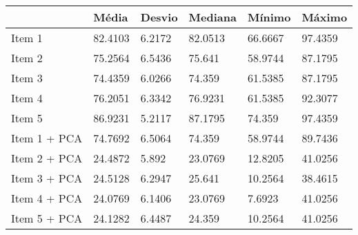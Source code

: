 \begin{tabular}{llllll}
& Média & Desvio & Mediana & Mínimo & Máximo \\ 
\hline 
Item 1 & 82.4103 & 6.2172 & 82.0513 & 66.6667 & 97.4359 \\ 
Item 2 & 75.2564 & 6.5436 & 75.641 & 58.9744 & 87.1795 \\ 
Item 3 & 74.4359 & 6.0266 & 74.359 & 61.5385 & 87.1795 \\ 
Item 4 & 76.2051 & 6.3342 & 76.9231 & 61.5385 & 92.3077 \\ 
Item 5 & 86.9231 & 5.2117 & 87.1795 & 74.359 & 97.4359 \\ 
Item 1 + PCA & 74.7692 & 6.5064 & 74.359 & 58.9744 & 89.7436 \\ 
Item 2 + PCA & 24.4872 & 5.892 & 23.0769 & 12.8205 & 41.0256 \\ 
Item 3 + PCA & 24.5128 & 6.2947 & 25.641 & 10.2564 & 38.4615 \\ 
Item 4 + PCA & 24.0769 & 6.1406 & 23.0769 & 7.6923 & 41.0256 \\ 
Item 5 + PCA & 24.1282 & 6.4487 & 24.359 & 10.2564 & 41.0256 \\ 
\hline 
\end{tabular}
